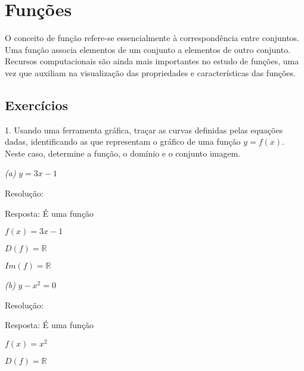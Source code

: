 \documentclass[12 pt, openright, twoside, a4paper, english, french, spanish, brazil]{abntex2}
\begin{document}
\bigskip


\section{Funções}

O conceito de função refere-se essencialmente à correspondência entre conjuntos. Uma função associa elementos de um conjunto a elementos de outro conjunto. Recursos computacionais são ainda mais importantes no estudo de funções, uma vez que auxiliam na visualização das propriedades e características das funções. 

\subsection{Exercícios}

1. Usando uma ferramenta gráfica, traçar as curvas definidas pelas equações dadas, identificando as que representam o gráfico de uma função $y = f(x)$. Neste caso, determine a função, o domínio e o conjunto imagem. 

\textit{(a)} $y = 3x - 1$

Resolução:


Resposta: É uma função

$f(x) = 3x - 1$ 

$D(f) = \mathbb{R}$

$Im(f) = \mathbb{R}$
\bigskip

\textit{(b)} $y - x^2 = 0$

Resolução:


Resposta: É uma função

$f(x) = x^2$ 

$D(f) = \mathbb{R}$
\end{document}
